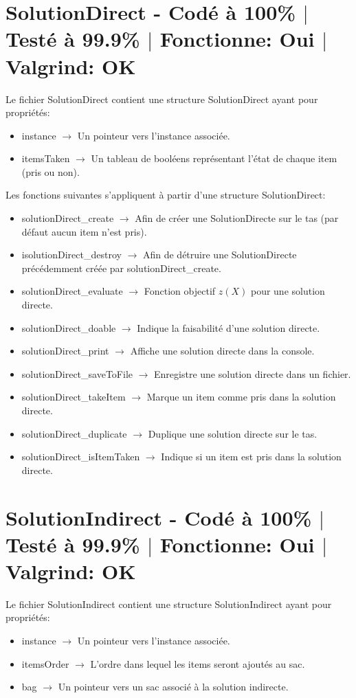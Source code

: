 \documentclass{EPUProjetPeiP}
\newcommand{\comp}[5]{
	\section[#1]{#1 {\small - Codé à #2\% $\vert$ Testé à #3\% $\vert$ Fonctionne: #4 $\vert$ Valgrind: #5}}
}
\begin{document}
\comp{SolutionDirect \label{sec:solutionDirect}}{100}{99.9}{Oui}{OK}
Le fichier SolutionDirect contient une structure SolutionDirect ayant pour propriétés:
\begin{itemize}
	\item instance $\longrightarrow$ Un pointeur vers l'instance associée.
	\item itemsTaken $\longrightarrow$ Un tableau de booléens représentant l'état de chaque item (pris ou non).\\
\end{itemize}

Les fonctions suivantes s'appliquent à partir d'une structure SolutionDirect:
\begin{itemize}
	\item solutionDirect\_create $\longrightarrow$ Afin de créer une SolutionDirecte sur le tas (par défaut aucun item n'est pris).
	\item isolutionDirect\_destroy $\longrightarrow$ Afin de détruire une SolutionDirecte précédemment créée par solutionDirect\_create.
	\item solutionDirect\_evaluate $\longrightarrow$ Fonction objectif $z(X)$ pour une solution directe.
	\item solutionDirect\_doable $\longrightarrow$ Indique la faisabilité d'une solution directe.
	\item solutionDirect\_print $\longrightarrow$ Affiche une solution directe dans la console.
	\item solutionDirect\_saveToFile $\longrightarrow$ Enregistre une solution directe dans un fichier.
	\item solutionDirect\_takeItem $\longrightarrow$ Marque un item comme pris dans la solution directe.
	\item solutionDirect\_duplicate $\longrightarrow$ Duplique une solution directe sur le tas.
	\item solutionDirect\_isItemTaken $\longrightarrow$ Indique si un item est pris dans la solution directe.
\end{itemize}

\comp{SolutionIndirect}{100}{99.9}{Oui}{OK}
Le fichier SolutionIndirect contient une structure SolutionIndirect ayant pour propriétés:
\begin{itemize}
	\item instance $\longrightarrow$ Un pointeur vers l'instance associée.
	\item itemsOrder $\longrightarrow$ L'ordre dans lequel les items seront ajoutés au sac.
	\item bag $\longrightarrow$ Un pointeur vers un sac associé à la solution indirecte.\\
\end{itemize}
\end{document}
